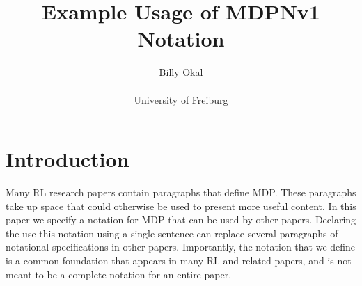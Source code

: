 \documentclass[a4paper]{article}
\author{Billy Okal\\\\
University of Freiburg}
\title{\bf \sffamily Example Usage of MDPNv1 Notation}
\date{}
\begin{document}
\maketitle


\section{Introduction}
\label{sec:intro}
Many \gls{RL} research papers contain paragraphs that define \gls{MDP}.
These paragraphs take up space that could otherwise be used to present more useful content.
In this paper we specify a notation for \gls{MDP} that can be used by other papers. Declaring the use this notation using a single sentence can replace several paragraphs of notational specifications in other papers.
Importantly, the notation that we define is a common foundation that appears in many \gls{RL} and related papers, and is not meant to be a complete notation for an entire paper.
\end{document}
